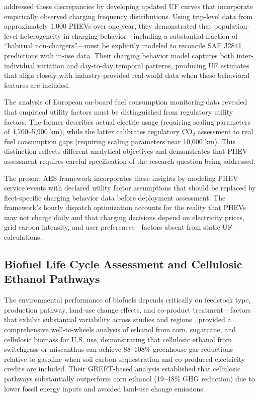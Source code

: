 \documentclass[cleantechnol,article,submit,pdftex,moreauthors]{Definitions/mdpi}
\begin{document}
\citet{Duoba2026} addressed these discrepancies by developing updated UF curves that incorporate empirically observed charging frequency distributions. Using trip-level data from approximately 1,000 PHEVs over one year, they demonstrated that population-level heterogeneity in charging behavior—including a substantial fraction of ``habitual non-chargers''—must be explicitly modeled to reconcile SAE J2841 predictions with in-use data. Their charging behavior model captures both inter-individual variation and day-to-day temporal patterns, producing UF estimates that align closely with industry-provided real-world data when these behavioral features are included.

The \citet{Fraunhofer2025} analysis of European on-board fuel consumption monitoring data revealed that empirical utility factors must be distinguished from regulatory utility factors. The former describes actual electric usage (requiring scaling parameters of 4,700--5,900 km), while the latter calibrates regulatory CO$_2$ assessment to real fuel consumption gaps (requiring scaling parameters near 10,000 km). This distinction reflects different analytical objectives and demonstrates that PHEV assessment requires careful specification of the research question being addressed.

The present AES framework incorporates these insights by modeling PHEV service events with declared utility factor assumptions that should be replaced by fleet-specific charging behavior data before deployment assessment. The framework's hourly dispatch optimization accounts for the reality that PHEVs may not charge daily and that charging decisions depend on electricity prices, grid carbon intensity, and user preferences—factors absent from static UF calculations.

\subsection{Biofuel Life Cycle Assessment and Cellulosic Ethanol Pathways}

The environmental performance of biofuels depends critically on feedstock type, production pathway, land-use change effects, and co-product treatment—factors that exhibit substantial variability across studies and regions \citep{Wang2012,Menten2013}. \citet{Wang2012} provided a comprehensive well-to-wheels analysis of ethanol from corn, sugarcane, and cellulosic biomass for U.S. use, demonstrating that cellulosic ethanol from switchgrass or miscanthus can achieve 88--108\% greenhouse gas reductions relative to gasoline when soil carbon sequestration and co-produced electricity credits are included. Their GREET-based analysis established that cellulosic pathways substantially outperform corn ethanol (19--48\% GHG reduction) due to lower fossil energy inputs and avoided land-use change emissions.
\end{document}
